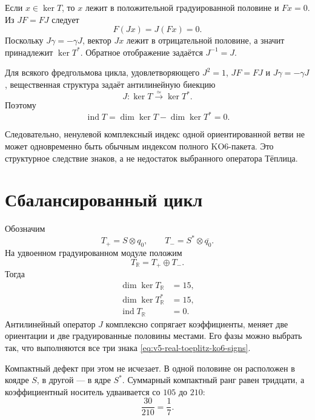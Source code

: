 Если $x\in\ker T$, то $x$ лежит в положительной градуированной половине
и $Fx=0$. Из $JF=FJ$ следует
\begin{equation}
 F(Jx)=J(Fx)=0.
\end{equation}
Поскольку $J\gamma=-\gamma J$, вектор $Jx$ лежит в отрицательной
половине, а значит принадлежит $\ker T^*$. Обратное отображение задаётся
$J^{-1}=J$.

\begin{theorem}
Для всякого фредгольмова цикла, удовлетворяющего
$J^2=1$, $JF=FJ$ и $J\gamma=-\gamma J$, вещественная структура задаёт
антилинейную биекцию
\begin{equation}
 J:\ker T\xrightarrow{\simeq}\ker T^*.
\end{equation}
Поэтому
\begin{equation}
 \operatorname{ind}T
 =\dim\ker T-\dim\ker T^*=0.
 \label{eq:v5-real-toeplitz-zero-index-theorem}
\end{equation}
\end{theorem}

Следовательно, ненулевой комплексный индекс одной ориентированной ветви
не может одновременно быть обычным индексом полного KO6-пакета. Это
структурное следствие знаков, а не недостаток выбранного оператора
Тёплица.

\section{Сбалансированный цикл}

Обозначим
\begin{equation}
 T_+=S\otimes q_0,
 \qquad
 T_-=S^*\otimes\overline{q_0}.
\end{equation}
На удвоенном градуированном модуле положим
\begin{equation}
 T_{\mathbb R}=T_+\oplus T_-.
 \label{eq:v5-real-toeplitz-balanced-T}
\end{equation}
Тогда
\begin{align}
 \dim\ker T_{\mathbb R}&=15,\\
 \dim\ker T_{\mathbb R}^*&=15,\\
 \operatorname{ind}T_{\mathbb R}&=0.
\end{align}
Антилинейный оператор $J$ комплексно сопрягает коэффициенты, меняет две
ориентации и две градуированные половины местами. Его фазы можно выбрать
так, что выполняются все три знака
\eqref{eq:v5-real-toeplitz-ko6-signs}.

Компактный дефект при этом не исчезает. В одной половине он расположен в
коядре $S$, в другой --- в ядре $S^*$. Суммарный компактный ранг равен
тридцати, а коэффициентный носитель удваивается со $105$ до $210$:
\begin{equation}
 \frac{30}{210}=\frac17.
 \label{eq:v5-real-toeplitz-weight-survives}
\end{equation}

